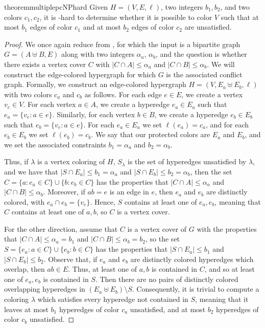 \begin{restatable}{theorem}{multiplepcNPhard}\label{thm:pc-multiple-classes-NP-hard}
	Given $H = (V, E, \ell)$, two integers $b_1, b_2$, and two colors $c_1, c_2$, it is -hard to determine whether
	it is possible to color $V$ such that at most $b_1$ edges of color $c_1$ and at most $b_2$ edges of color $c_2$ are unsatisfied. 
\end{restatable}
\begin{proof}
    We once again reduce from \constrainedbipartiteVC{}, for which the input is a bipartite graph $G = (A \uplus B, E)$ along with two integers $\alpha_a$, $\alpha_b$, and the question is whether there exists a vertex cover $C$ with $|C \cap A| \leq \alpha_a$ and $|C \cap B| \leq \alpha_b$.
    We will construct the edge-colored hypergraph for which $G$ is the associated conflict graph.
    Formally, we construct an edge-colored hypergraph $H = (V, E_a \uplus E_b, \ell)$ with two colors $c_a$ and $c_b$ as follows. For each edge $e \in E$, we create a vertex $v_e \in V$.
    For each vertex $a \in A$, we create a hyperedge $e_a \in E_a$ such that $e_a = \{v_e \colon a \in e\}$. Similarly,
    for each vertex $b \in B$, we create a hyperedge $e_b \in E_b$ such that $e_b = \{v_e \colon a \in e\}$.
    For each $e_a \in E_a$ we set $\ell(e_a) = c_a$, and for each $e_b \in E_b$ we set $\ell(e_b) = c_b$.
    We say that our protected colors are $E_a$ and $E_b$, and we set the associated constraints $b_1 = \alpha_a$ and $b_2 = \alpha_b$.

    Thus, if $\lambda$ is a vertex coloring of $H$, $S_\lambda$ is the set of hyperedges unsatisfied by $\lambda$, and we have that $|S \cap E_a| \leq b_1 = \alpha_a$ and $|S \cap E_b| \leq b_2 = \alpha_b$,
    then the set $C = \{a \colon e_a \in C \} \cup \{b \colon e_b \in C \}$ has the properties that $|C \cap A| \leq \alpha_a$ and $|C \cap B| \leq \alpha_b$.
    Moreover, if $ab = e$ is an edge in $e$, then $e_a$ and $e_b$ are distinctly colored, with $e_a \cap e_b = \{v_e\}$.
    Hence, $S$ contains at least one of $e_a, e_b$, meaning that $C$ contains at least one of $a, b$, so $C$ is a vertex cover.

    For the other direction, assume that $C$ is a vertex cover of $G$ with the properties that $|C \cap A| \leq \alpha_a = b_1$ and $|C \cap B| \leq \alpha_b = b_2$,
    so the set $S = \{e_a \colon a \in C\} \cup \{e_b \colon b \in C\}$ has the properties that $|S \cap E_a| \leq b_1$ and $|S \cap E_b| \leq b_2$.
    Observe that, if $e_a$ and $e_b$ are distinctly colored hyperedges which overlap, then $ab \in E$. Thus, at least one of $a, b$ is contained in $C$, and so at least one of $e_a, e_b$ is contained in $S$.
    Then there are no pairs of distinctly colored overlapping hyperedges in $(E_a \uplus E_b)\setminus S$.
    Consequently, it is trivial to compute a coloring $\lambda$ which satisfies every hyperedge not contained in $S$, meaning that it leaves at most $b_1$ hyperedges of color $c_a$ unsatisfied, and at most $b_2$ hyperedges of color $c_b$ unsatisfied.
\end{proof}
